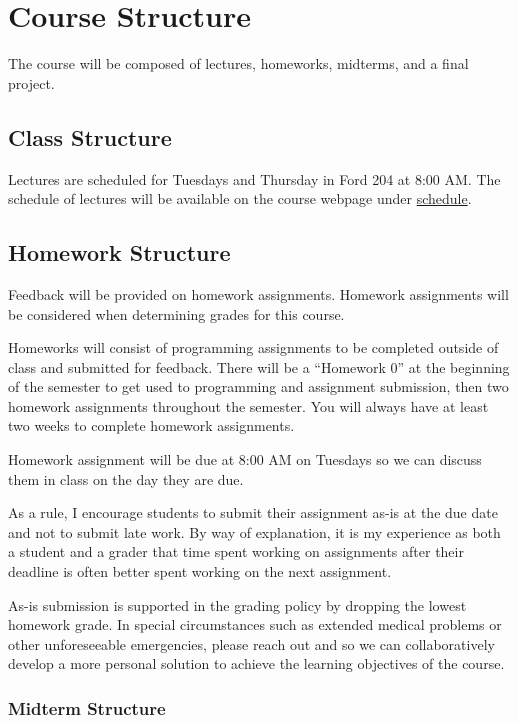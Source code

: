 \documentclass[11pt]{article}
\begin{document}

\section*{Course Structure}

The course will be composed of lectures, homeworks, midterms, and a final project.

\subsection*{Class Structure}

Lectures are scheduled for Tuesdays and Thursday in Ford 204 at 8:00 AM. The schedule
of lectures will be available on the course webpage under \href{https://cd-public.github.io/courses/sys/sched.html}{schedule}.

\subsection*{Homework Structure}

Feedback will be provided on homework assignments. Homework assignments will be considered when determining grades for this course.

Homeworks will consist of programming assignments to be completed outside of class and submitted
for feedback. There will be a ``Homework 0'' at the beginning of the semester to get used to
programming and assignment submission, then two homework assignments throughout the semester.
You will always have at least two weeks to complete homework assignments.

Homework assignment will be due at 8:00 AM on Tuesdays so we can discuss them in class on the
day they are due.

As a rule, I encourage students to submit their assignment as-is at the due date and not to
submit late work. By way of explanation, it is my experience as both a student and a grader that time spent working on assignments after their deadline is often better spent working on the next assignment.

As-is submission is supported in the grading policy by dropping the lowest homework
grade. In special circumstances such as extended medical problems or other unforeseeable
emergencies, please reach out and so we can collaboratively develop a more personal
solution to achieve the learning objectives of the course.

\subsubsection*{Midterm Structure}
\end{document}

